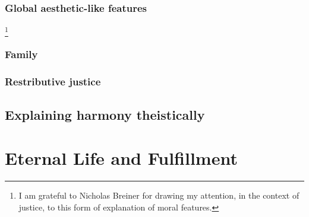 \subsection{Global aesthetic-like features}\footnote{I am grateful to Nicholas Breiner for drawing my attention, in the context of
justice, to this form of explanation of moral features.}
\subsection{Family}
\subsection{Restributive justice}

\section{Explaining harmony theistically}
\chaptertail

\def\mychapter{X}

\chapter{Eternal Life and Fulfillment}\label{ch:eternal-life}
\chaptertail

